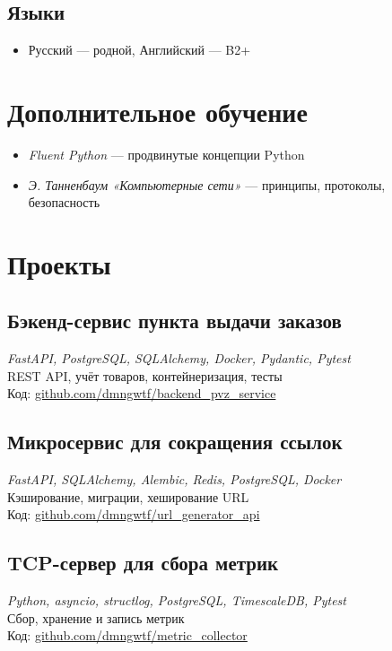 \documentclass[a4paper,11pt]{article}
\begin{document}
	\subsection*{Языки}
	\begin{itemize}
		\item Русский — родной, Английский — B2+
	\end{itemize}
	
	\section*{Дополнительное обучение}
	\begin{itemize}
		\item \textit{Fluent Python} — продвинутые концепции Python
		\item \textit{Э. Танненбаум «Компьютерные сети»} — принципы, протоколы, безопасность
	\end{itemize}
	
	\section*{Проекты}
	
	\subsection*{Бэкенд-сервис пункта выдачи заказов}
	\textit{FastAPI, PostgreSQL, SQLAlchemy, Docker, Pydantic, Pytest}\\
	REST API, учёт товаров, контейнеризация, тесты\\
	Код: \href{https://github.com/dmngwtf/backend_pvz_service}{github.com/dmngwtf/backend\_pvz\_service}
	
	\subsection*{Микросервис для сокращения ссылок}
	\textit{FastAPI, SQLAlchemy, Alembic, Redis, PostgreSQL, Docker}\\
	Кэширование, миграции, хеширование URL\\
	Код: \href{https://github.com/dmngwtf/url_generator_api}{github.com/dmngwtf/url\_generator\_api}
	
	\subsection*{TCP-сервер для сбора метрик}
	\textit{Python, asyncio, structlog, PostgreSQL, TimescaleDB, Pytest}\\
	Сбор, хранение и запись метрик\\
	Код: \href{https://github.com/dmngwtf/metric_collector}{github.com/dmngwtf/metric\_collector}
	
\end{document}
